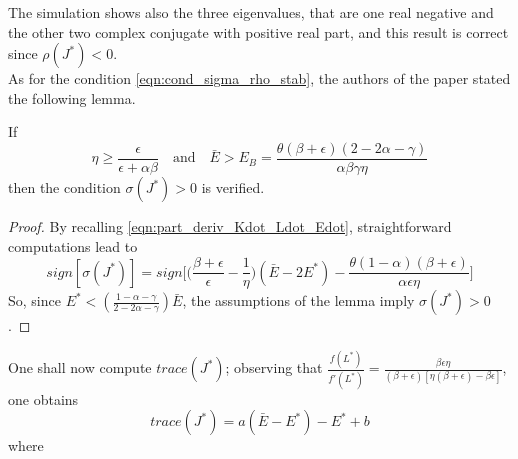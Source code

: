 The simulation shows also the three eigenvalues, that are one real negative and the other two complex conjugate with positive real part, and this result is correct since $\rho(J^*)<0$.\\
As for the condition \eqref{eqn:cond_sigma_rho_stab}, the authors of the paper stated the following lemma.
\begin{lemma}
	If 
	\begin{equation} \label{eqn:lemma_3}
		\eta\geq \frac{\epsilon}{\epsilon+\alpha\beta} \quad \text{and} \quad \bar{E}>E_B=\frac{\theta(\beta+\epsilon)(2-2\alpha-\gamma)}{\alpha\beta\gamma\eta}
	\end{equation}
	then the condition $\sigma(J^*)>0$ is verified.
\end{lemma}
\begin{proof}
	By recalling \eqref{eqn:part_deriv_Kdot_Ldot_Edot}, straightforward computations lead to 
	$$ sign[\sigma(J^*)] = sign\Bigg[\Bigg(\frac{\beta+\epsilon}{\epsilon}-\frac{1}{\eta}\Bigg)(\bar{E}-2E^*)-\frac{\theta(1-\alpha)(\beta+\epsilon)}{\alpha\epsilon\eta}\Bigg] $$
	So, since $E^*<(\frac{1-\alpha-\gamma}{2-2\alpha-\gamma})\bar{E}$, the assumptions of the lemma imply $\sigma(J^*)>0$.
\end{proof}
One shall now compute $trace(J^*)$; observing that $\frac{f(L^*)}{f'(L^*)}=\frac{\beta\epsilon\eta}{(\beta+\epsilon)[\eta(\beta+\epsilon)-\beta\epsilon]}$, one obtains $$trace(J^*)=a(\bar{E}-E^*)-E^*+b$$ where 

